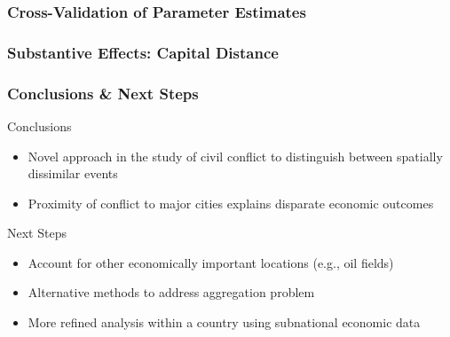 \begin{frame}
\frametitle{Cross-Validation of Parameter Estimates}

\begin{figure}[ht]
	\centering
	\resizebox{1\textwidth}{!}{}
\end{figure}

\end{frame}

\begin{frame}
\frametitle{Substantive Effects: Capital Distance}

\vspace{-6mm}
\begin{figure}
	\centering
	\resizebox{1\textwidth}{!}{}
\end{figure}

\end{frame}

\begin{frame}
\frametitle{Conclusions \& Next Steps}

\begin{block}{Conclusions}
\begin{itemize}
	\item Novel approach in the study of civil conflict to distinguish between spatially dissimilar events
	\item Proximity of conflict to major cities explains disparate economic outcomes
\end{itemize}
\end{block}

\begin{block}{Next Steps}
\begin{itemize}
\item Account for other economically important locations (e.g., oil fields)
\item Alternative methods to address aggregation problem
\item More refined analysis within a country using subnational economic data
\end{itemize}
\end{block}

\end{frame}
